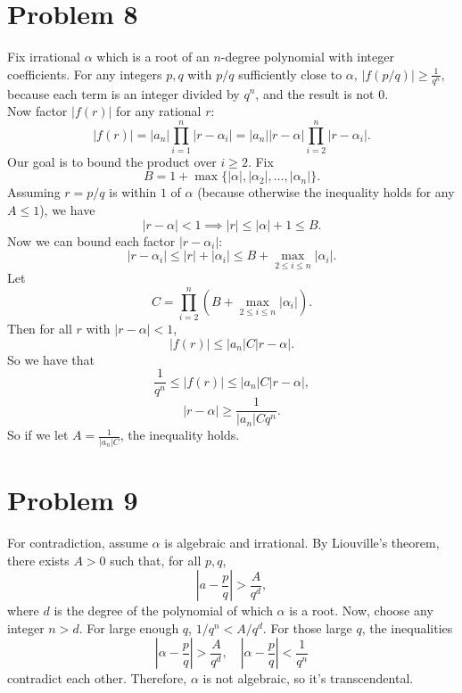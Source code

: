 \documentclass{article}
\newcommand{\bigabs}[1]{\left|#1\right|}
\begin{document}
\section*{Problem 8}

Fix irrational $\alpha$ which is a root of an $n$-degree polynomial with integer coefficients. For any integers $p, q$ with $p/q$ sufficiently close to $\alpha$, $|f(p/q)| \ge \frac{1}{q^n}$, because each term is an integer divided by $q^n$, and the result is not $0$. \\

Now factor $|f(r)|$ for any rational $r$:
$$|f(r)| = |a_n|\prod_{i = 1}^n |r - \alpha_i| = |a_n||r - \alpha|\prod_{i = 2}^n |r - \alpha_i|.$$
Our goal is to bound the product over $i \ge 2$. Fix
$$B = 1 + \max\{|\alpha|, |\alpha_2|, \ldots, |\alpha_n|\}.$$
Assuming $r = p/q$ is within $1$ of $\alpha$ (because otherwise the inequality holds for any $A \le 1$), we have
$$|r - \alpha| < 1 \implies |r| \le |\alpha| + 1 \le B.$$
Now we can bound each factor $|r - \alpha_i|$:
$$|r - \alpha_i| \le |r| + |\alpha_i| \le B + \max_{2 \le i \le n} |\alpha_i|.$$
Let
$$C = \prod_{i = 2}^n (B + \max_{2 \le i \le n} |\alpha_i|).$$
Then for all $r$ with $|r - \alpha| < 1$,
$$|f(r)| \le |a_n|C|r - \alpha|.$$
So we have that
$$\frac{1}{q^n} \le |f(r)| \le |a_n|C|r - \alpha|,$$
$$|r - \alpha| \ge \frac{1}{|a_n|Cq^n}.$$
So if we let $A = \frac{1}{|a_n|C}$, the inequality holds.

\section*{Problem 9}

For contradiction, assume $\alpha$ is algebraic and irrational. By Liouville's theorem, there exists $A > 0$ such that, for all $p, q$,
$$\bigabs{a - \frac{p}{q}} > \frac{A}{q^d},$$
where $d$ is the degree of the polynomial of which $\alpha$ is a root. Now, choose any integer $n > d$. For large enough $q$, $1/q^n < A/q^d$. For those large $q$, the inequalities
$$\bigabs{\alpha - \frac{p}{q}} > \frac{A}{q^d},\quad \bigabs{\alpha - \frac{p}{q}} < \frac{1}{q^n}$$
contradict each other. Therefore, $\alpha$ is not algebraic, so it's transcendental.
\end{document}
